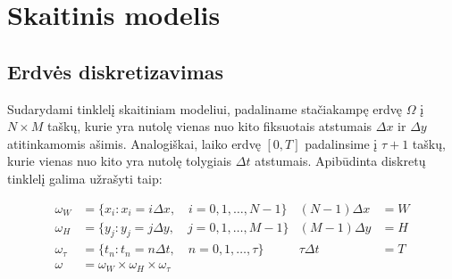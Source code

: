 \section{Skaitinis modelis}

\subsection{Erdvės diskretizavimas}

Sudarydami tinklelį skaitiniam modeliui, padaliname stačiakampę erdvę $\Omega$ į $N\times M$ taškų, kurie yra nutolę vienas nuo kito fiksuotais atstumais $\Delta x$ ir $\Delta y$ atitinkamomis ašimis. Analogiškai, laiko erdvę $[0, T]$ padalinsime į $\tau + 1$ taškų, kurie vienas nuo kito yra nutolę tolygiais $\Delta t$ atstumais. Apibūdinta diskretų tinklelį galima užrašyti taip:

\begin{align}
    \omega_W&=\{ x_i : x_i = i\Delta x, \quad i=0, 1, \dots, N - 1 \} & (N-1)\Delta x&=W \label{meshx}\\
    \omega_H&=\{ y_j : y_j = j\Delta y, \quad j=0, 1, \dots, M - 1 \} & (M-1)\Delta y&=H \label{meshy}\\
    \omega_\tau&=\{ t_n : t_n = n\Delta t,\quad n=0, 1, \dots, \tau\} & \tau\Delta t&=T \label{mesht}\\
	\omega&=\omega_W\times\omega_H\times\omega_\tau \label{mesh}
\end{align}

